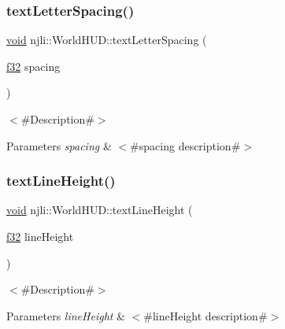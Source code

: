 \subsubsection{\texorpdfstring{text\+Letter\+Spacing()}{textLetterSpacing()}}
{\footnotesize\ttfamily \mbox{\hyperlink{_thread_8h_af1e856da2e658414cb2456cb6f7ebc66}{void}} njli\+::\+World\+H\+U\+D\+::text\+Letter\+Spacing (\begin{DoxyParamCaption}\item[{\mbox{\hyperlink{_util_8h_a5f6906312a689f27d70e9d086649d3fd}{f32}}}]{spacing }\end{DoxyParamCaption})}

$<$\#\+Description\#$>$


\begin{DoxyParams}{Parameters}
{\em spacing} & $<$\#spacing description\#$>$ \\
\hline
\end{DoxyParams}
\mbox{\label{classnjli_1_1_world_h_u_d_a4aefcaeea459b42c7727d301db80ed4c}} 
\subsubsection{\texorpdfstring{text\+Line\+Height()}{textLineHeight()}}
{\footnotesize\ttfamily \mbox{\hyperlink{_thread_8h_af1e856da2e658414cb2456cb6f7ebc66}{void}} njli\+::\+World\+H\+U\+D\+::text\+Line\+Height (\begin{DoxyParamCaption}\item[{\mbox{\hyperlink{_util_8h_a5f6906312a689f27d70e9d086649d3fd}{f32}}}]{line\+Height }\end{DoxyParamCaption})}

$<$\#\+Description\#$>$


\begin{DoxyParams}{Parameters}
{\em line\+Height} & $<$\#line\+Height description\#$>$ \\
\hline
\end{DoxyParams}
\mbox{\label{classnjli_1_1_world_h_u_d_a1c2fe58e99ad361f25745a1a7abfb1aa}} 
